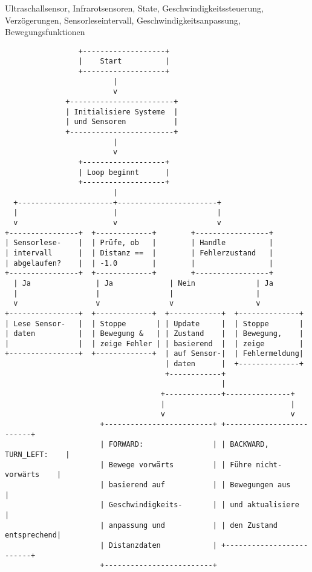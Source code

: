 \documentclass{vorlage-design-main}
\begin{document}
Ultraschallsensor, Infrarotsensoren, State, Geschwindigkeitssteuerung,
Verzögerungen, Sensorleseintervall, Geschwindigkeitsanpassung,
Bewegungsfunktionen

\newpage

\begin{lstlisting}
                 +-------------------+
                 |    Start          |
                 +-------------------+
                         |
                         v
              +------------------------+
              | Initialisiere Systeme  |
              | und Sensoren           |
              +------------------------+
                         |
                         v
                 +-------------------+
                 | Loop beginnt      |
                 +-------------------+
                         |
  +----------------------+-----------------------+
  |                      |                       |
  v                      v                       v
+----------------+  +-------------+        +-----------------+
| Sensorlese-    |  | Prüfe, ob   |        | Handle          |
| intervall      |  | Distanz ==  |        | Fehlerzustand   |
| abgelaufen?    |  | -1.0        |        |                 |
+----------------+  +-------------+        +-----------------+
  | Ja               | Ja             | Nein              | Ja
  |                  |                |                   |
  v                  v                v                   v
+----------------+  +-------------+  +------------+  +--------------+
| Lese Sensor-   |  | Stoppe       | | Update     |  | Stoppe       |
| daten          |  | Bewegung &   | | Zustand    |  | Bewegung,    |
|                |  | zeige Fehler | | basierend  |  | zeige        |
+----------------+  +-------------+  | auf Sensor-|  | Fehlermeldung|
                                     | daten      |  +--------------+
                                     +------------+
                                                  |
                                    +-------------+---------------+
                                    |                             |
                                    v                             v
                      +-------------------------+ +-------------------------+
                      | FORWARD:                | | BACKWARD, TURN_LEFT:    |
                      | Bewege vorwärts         | | Führe nicht-vorwärts    |
                      | basierend auf           | | Bewegungen aus          |
                      | Geschwindigkeits-       | | und aktualisiere        |
                      | anpassung und           | | den Zustand entsprechend|
                      | Distanzdaten            | +-------------------------+
                      +-------------------------+
\end{lstlisting}
\end{document}

